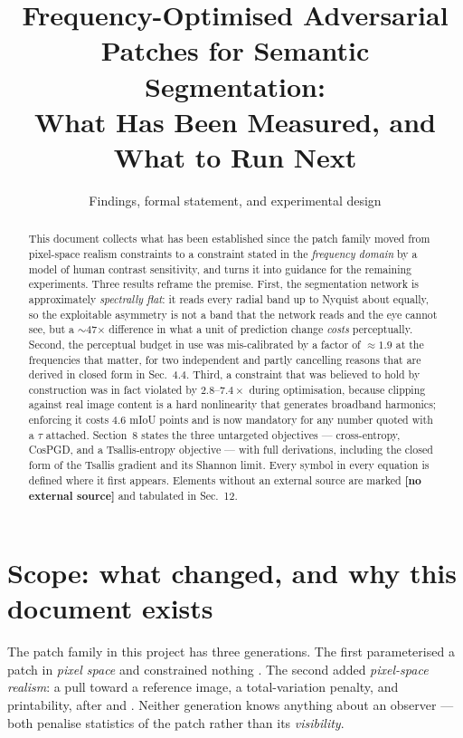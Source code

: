 \documentclass[11pt,a4paper]{article}
\title{Frequency-Optimised Adversarial Patches for Semantic
       Segmentation:\\[2pt]
       \large What Has Been Measured, and What to Run Next}
\author{Findings, formal statement, and experimental design}
\date{}
\newcommand{\novel}{\textbf{[no external source]}}
\begin{document}
\maketitle

\begin{abstract}
\noindent
This document collects what has been established since the patch family
moved from pixel-space realism constraints to a constraint stated in the
\emph{frequency domain} by a model of human contrast sensitivity, and turns
it into guidance for the remaining experiments. Three results reframe the
premise. First, the segmentation network is approximately \emph{spectrally
flat}: it reads every radial band up to Nyquist about equally, so the
exploitable asymmetry is not a band that the network reads and the eye
cannot see, but a $\sim$47$\times$ difference in what a unit of prediction
change \emph{costs} perceptually. Second, the perceptual budget in use was
mis-calibrated by a factor of $\approx1.9$ at the frequencies that matter,
for two independent and partly cancelling reasons that are derived in closed
form in Sec.~4.4. Third, a constraint that was believed to hold by
construction was in fact violated by $2.8$--$7.4\times$ during optimisation,
because clipping against real image content is a hard nonlinearity that
generates broadband harmonics; enforcing it costs $4.6$ mIoU points and is
now mandatory for any number quoted with a $\tau$ attached. Section~8 states
the three untargeted objectives --- cross-entropy, CosPGD, and a
Tsallis-entropy objective --- with full derivations, including the closed
form of the Tsallis gradient and its Shannon limit. Every symbol in every
equation is defined where it first appears. Elements without an external
source are marked \novel{} and tabulated in Sec.~12.
\end{abstract}

\tableofcontents

\section{Scope: what changed, and why this document exists}

The patch family in this project has three generations. The first
parameterised a patch in \emph{pixel space} and constrained nothing
\citep{brown2017patch}. The second added \emph{pixel-space realism}: a pull
toward a reference image, a total-variation penalty, and printability, after
\citet{tan2021lap} and \citet{sharif2016nps}. Neither generation knows
anything about an observer --- both penalise statistics of the patch rather
than its \emph{visibility}.
\end{document}

